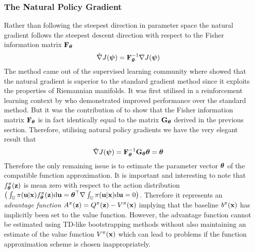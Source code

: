 \subsubsection{The Natural Policy Gradient}
Rather than following the steepest direction in parameter space the natural gradient follows the steepest descent direction with respect to the Fisher information matrix $\mathbf{F}_{\boldsymbol{\theta}}$
\begin{equation*}
\tilde\nabla  J(\boldsymbol{\psi}) = \mathbf{F}_{\boldsymbol{\theta}}^{-1} \nabla  J(\boldsymbol{\psi})
\end{equation*}
The method came out of the supervised learning community where \cite{Ama98} showed that the natural gradient is superior to the standard gradient method since it exploits the properties of Riemannian manifolds. It was first utilised in a reinforcement learning context by \cite{Kak02} who demonstrated improved performance over the standard method. But it was the contribution of \cite{PVS05} to show that the Fisher information matrix $\mathbf{F}_{\boldsymbol{\theta}}$ is in fact identically equal to the matrix $\mathbf{G}_{\boldsymbol{\theta}}$ derived in the previous section. Therefore, utilising natural policy gradients we have the very elegant result that
\begin{equation*}
\tilde\nabla J(\boldsymbol{\psi}) = \mathbf{F}_{\boldsymbol{\theta}}^{-1} \mathbf{G}_{\boldsymbol{\theta}} \boldsymbol{\theta} = \boldsymbol{\theta}
\end{equation*}
Therefore the only remaining issue is to estimate the parameter vector $\boldsymbol{\theta}$ of the compatible function approximation.
It is important and interesting to note that $f^\pi_{\boldsymbol{\theta}}(\mathbf{z})$ is mean zero with respect to the action distribution $\big(\int_{\mathbb{U}} \pi(\mathbf{u}|\mathbf{x}) f^\pi_{\boldsymbol{\theta}}(\mathbf{z})\mathrm{d}\mathbf{u} = \boldsymbol{\theta}^\top \nabla\int_{\mathbb{U}} \pi(\mathbf{u}|\mathbf{x})\mathrm{d}\mathbf{u} =0 \big)$. Therefore it represents an \textit{advantage function} $A^\pi(\mathbf{z}) = Q^\pi(\mathbf{z}) - V^\pi(\mathbf{x})$ implying that the baseline $b^\pi(\mathbf{x})$ has implicitly been set to the value function. However, the advantage function cannot be estimated using TD-like bootstrapping methods without also maintaining an estimate of the value function $V^\pi(\mathbf{x})$ which can lead to problems if the function approximation scheme is chosen inappropriately.

